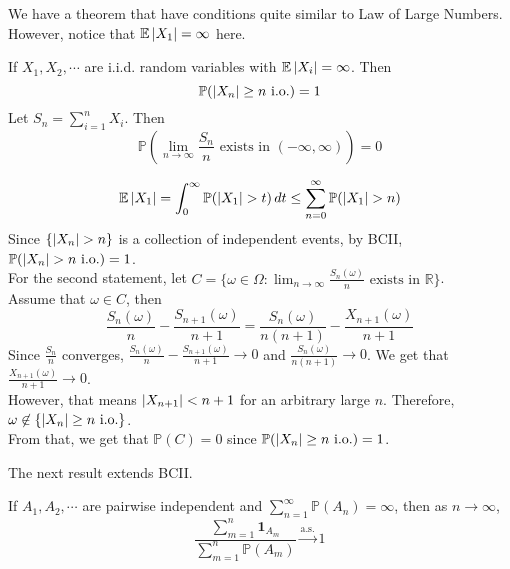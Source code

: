 \documentclass{huhtakm-template-book}
\newcommand{\prob}{\mathbb{P}}
\newcommand{\expect}{\mathbb{E}}
\begin{document}
We have a theorem that have conditions quite similar to Law of Large Numbers. However, notice that $\expect\abs{X_{1}}=\infty$ here.
\begin{thm}
    If $X_{1},X_{2},\cdots$ are i.i.d. random variables with $\expect\abs{X_{i}}=\infty$. Then
    \begin{equation*}
        \prob(\abs{X_{n}}\geq n\text{ i.o.})=1
    \end{equation*}
    Let $S_{n}=\sum_{i=1}^{n}X_{i}$. Then
    \begin{equation*}
        \prob\left(\lim_{n\to\infty}\frac{S_{n}}{n}\text{ exists in }(-\infty,\infty)\right)=0
    \end{equation*}
\end{thm}
\begin{proofing}
    \begin{equation*}
        \expect\abs{X_{1}}=\int_{0}^{\infty}\prob(\abs{X_{1}}>t)\,dt\leq\sum_{n=0}^{\infty}\prob(\abs{X_{1}}>n)
    \end{equation*}
    Since $\{\abs{X_{n}}>n\}$ is a collection of independent events, by BCII, $\prob(\abs{X_{n}}>n\text{ i.o.})=1$.\\
    For the second statement, let $C=\{\omega\in\Omega:\lim_{n\to\infty}\frac{S_{n}(\omega)}{n}\text{ exists in }\mathbb{R}\}$.\\
    Assume that $\omega\in C$, then
    \begin{equation*}
        \frac{S_{n}(\omega)}{n}-\frac{S_{n+1}(\omega)}{n+1}=\frac{S_{n}(\omega)}{n(n+1)}-\frac{X_{n+1}(\omega)}{n+1}
    \end{equation*}
    Since $\frac{S_{n}}{n}$ converges, $\frac{S_{n}(\omega)}{n}-\frac{S_{n+1}(\omega)}{n+1}\to 0$ and $\frac{S_{n}(\omega)}{n(n+1)}\to 0$. We get that $\frac{X_{n+1}(\omega)}{n+1}\to 0$.\\
    However, that means $\left|{X_{n+1}}\right|<n+1$ for an arbitrary large $n$. Therefore, $\omega\not\in\{\left|{X_{n}}\right|\geq n\text{ i.o.}\}$.\\
    From that, we get that $\prob(C)=0$ since $\prob(\abs{X_{n}}\geq n\text{ i.o.})=1$.
\end{proofing}
\newpage
The next result extends BCII.
\begin{thm}
    If $A_{1},A_{2},\cdots$ are pairwise independent and $\sum_{n=1}^{\infty}\prob(A_{n})=\infty$, then as $n\to\infty$,
    \begin{equation*}
        \frac{\sum_{m=1}^{n}\mathbf{1}_{A_{m}}}{\sum_{m=1}^{n}\prob(A_{m})}\xrightarrow{\text{a.s.}}1
    \end{equation*}
\end{thm}
\end{document}

